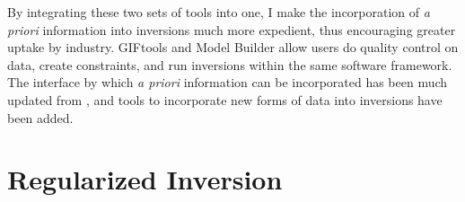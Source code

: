 By integrating these two sets of tools into one, I make the incorporation of \emph{a priori} information into inversions much more expedient, thus encouraging greater uptake by industry.  GIFtools and Model Builder allow users do quality control on data, create constraints, and run inversions within the same software framework. The interface by which \emph{a priori} information can be incorporated has been much updated from \cite{williams2008geologically}, and tools to incorporate new forms of data into inversions have been added. 




\section{Regularized Inversion}
\label{sec:Regularized Inversion}

